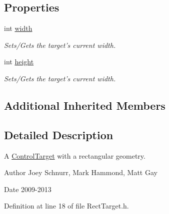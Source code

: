\subsection*{Properties}
\begin{DoxyCompactItemize}
\item 
\hypertarget{class_picto_1_1_rect_target_a606a7d78590ab568c0181fce1b3e9a5d}{int \hyperlink{class_picto_1_1_rect_target_a606a7d78590ab568c0181fce1b3e9a5d}{width}}\label{class_picto_1_1_rect_target_a606a7d78590ab568c0181fce1b3e9a5d}

\begin{DoxyCompactList}\small\item\em Sets/\-Gets the target's current width. \end{DoxyCompactList}\item 
\hypertarget{class_picto_1_1_rect_target_a8617cd6f4cd1fd36b8006c4e44df6641}{int \hyperlink{class_picto_1_1_rect_target_a8617cd6f4cd1fd36b8006c4e44df6641}{height}}\label{class_picto_1_1_rect_target_a8617cd6f4cd1fd36b8006c4e44df6641}

\begin{DoxyCompactList}\small\item\em Sets/\-Gets the target's current width. \end{DoxyCompactList}\end{DoxyCompactItemize}
\subsection*{Additional Inherited Members}


\subsection{Detailed Description}
A \hyperlink{class_picto_1_1_control_target}{Control\-Target} with a rectangular geometry. 

\begin{DoxyAuthor}{Author}
Joey Schnurr, Mark Hammond, Matt Gay 
\end{DoxyAuthor}
\begin{DoxyDate}{Date}
2009-\/2013 
\end{DoxyDate}


Definition at line 18 of file Rect\-Target.\-h.




